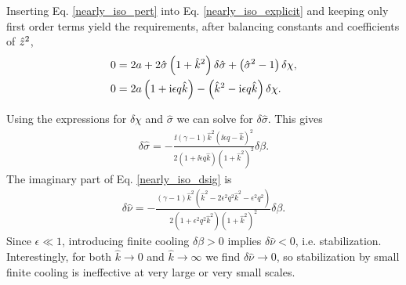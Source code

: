 Inserting Eq. \ref{nearly_iso_pert} into Eq. \ref{nearly_iso_explicit}
and keeping only first order terms yield the requirements, after
balancing constants and coefficients of $\hat{z}^2$, 
\begin{align}
  0 &= 2a + 2\hat{\sigma}\left(1+\hat{k}^2\right)\delta\hat{\sigma} +
  \left(\hat{\sigma}^2 -1\right)\delta\chi,\notag\\
  0&= 2a\left(1+\mathrm{i}\epsilon q \hat{k}\right) - \left(\hat{k}^2 - \mathrm{i}\epsilon
    q \hat{k}\right)\delta\chi.
\end{align} 

Using the expressions for $\delta\chi$ and $\hat{\sigma}$ we can solve
for $\delta\hat{\sigma}$. This gives 
\begin{align}\label{nearly_iso_dsig}
  \delta \hat{\sigma} =
  -\frac{\ii\left(\gamma-1\right)\hat{k}^2\left(\ii\epsilon
      q - \hat{k}\right)^2}{2\left(1+\ii\epsilon q \hat{k}\right)\left(1+\hat{k}^2\right)^2}\delta\beta.
\end{align}
The imaginary part of Eq. \ref{nearly_iso_dsig} is
\begin{align}
  \delta\hat{\nu} =
  -\frac{\left(\gamma-1\right)\hat{k}^2 \left(\hat{k}^2 -
      2\epsilon^2q^2\hat{k}^2 - \epsilon^2q^2\right)}{2\left(1+\epsilon^2 q^2
      \hat{k}^2\right)\left(1+\hat{k}^2\right)^2}\delta\beta.  
\end{align}
Since $\epsilon \ll 1$, introducing finite cooling $\delta\beta>0$
implies $\delta\hat{\nu} < 0$, i.e. stabilization. Interestingly, for both
$\hat{k}\to0$ and $\hat{k}\to\infty$ we find $\delta\hat{\nu}\to0$, so
stabilization by small finite cooling is ineffective at very large or
very small scales. 

